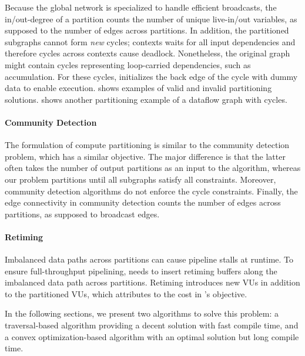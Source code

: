 Because the global network is specialized to handle efficient broadcasts, 
the in/out-degree of a partition counts the number of unique live-in/out variables, as supposed to
the number of edges across partitions.
In addition, the partitioned subgraphs cannot form {\em new} cycles; contexts waits for all
input dependencies and therefore cycles across contexts cause deadlock. 
Nonetheless, the original graph might contain cycles representing loop-carried dependencies, such as
accumulation. For these cycles, \name initializes the back edge of the cycle with dummy data to
enable execution.
 shows examples of valid and invalid partitioning solutions.
 shows another partitioning example of a dataflow graph with cycles.

\paragraph{Community Detection}
The formulation of compute partitioning is similar to the community detection problem\cite{community}, which has a similar
objective. The major difference is that the latter often takes the number of output partitions as an
input to the algorithm, whereas our problem partitions until all subgraphs satisfy all constraints.
Moreover, community detection algorithms do not enforce the cycle constraints. 
Finally, the edge connectivity in community detection counts the number of edges across partitions, as supposed to broadcast edges.

\paragraph{Retiming}
Imbalanced data paths across partitions can cause pipeline stalls at runtime.
To ensure full-throughput pipelining, \name needs to insert retiming buffers along the imbalanced data path across
partitions.
Retiming introduces new VUs in addition to the partitioned VUs, which attributes to the cost in
's objective.

In the following sections, we present two algorithms to solve this problem:
a traversal-based algorithm providing a decent solution with fast compile time, and a convex
optimization-based algorithm with an optimal solution but long compile time.

